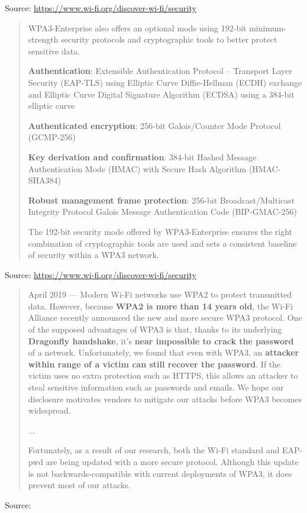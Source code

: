\documentclass[Screen16to9,17pt]{foils}
\begin{document}
Source: \url{https://www.wi-fi.org/discover-wi-fi/security}



\begin{quote}

WPA3-Enterprise also offers an optional mode using 192-bit minimum-strength security protocols and cryptographic tools to better protect sensitive data.

\begin{list2}
\item {\bf Authentication}: Extensible Authentication Protocol – Transport Layer Security (EAP-TLS) using Elliptic Curve Diffie-Hellman (ECDH) exchange and Elliptic Curve Digital Signature Algorithm (ECDSA) using a 384-bit elliptic curve
\item {\bf Authenticated encryption}: 256-bit Galois/Counter Mode Protocol (GCMP-256)
\item {\bf Key derivation and confirmation}: 384-bit Hashed Message Authentication Mode (HMAC) with Secure Hash Algorithm (HMAC-SHA384)
\item {\bf Robust management frame protection}: 256-bit Broadcast/Multicast Integrity Protocol Galois Message Authentication Code (BIP-GMAC-256)
\end{list2}
The 192-bit security mode offered by WPA3-Enterprise ensures the right combination of cryptographic tools are used and sets a consistent baseline of security within a WPA3 network.
\end{quote}

Source: \url{https://www.wi-fi.org/discover-wi-fi/security}






\begin{quote}\small
April 2019 — Modern Wi-Fi networks use WPA2 to protect transmitted data. However, because {\bf WPA2 is more than 14 years old}, the Wi-Fi Alliance recently announced the new and more secure WPA3 protocol. One of the supposed advantages of WPA3 is that, thanks to its underlying {\bf Dragonfly handshake}, it's {\bf near impossible to crack the password} of a network. Unfortunately, we found that even with WPA3, an {\bf attacker within range of a victim can still recover the password}. If the victim uses no extra protection such as HTTPS, this allows an attacker to steal sensitive information such as passwords and emails. We hope our disclosure motivates vendors to mitigate our attacks before WPA3 becomes widespread.

...

Fortunately, as a result of our research, both the Wi-Fi standard and EAP-pwd are being updated with a more secure protocol. Although this update is not backwards-compatible with current deployments of WPA3, it does prevent most of our attacks.
\end{quote}
Source: 
\end{document}

